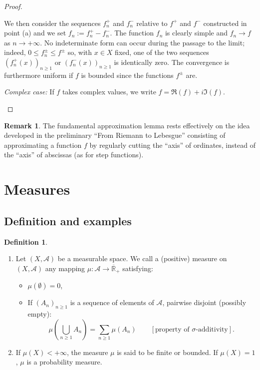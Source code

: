 \documentclass[12pt]{article}
\theoremstyle{definition}
\newtheorem{definition}{Definition}[section]
\newtheorem{remark}{Remark}[section]
\begin{document}
\begin{proof}
\begin{itemize}
We then consider the sequences $f_n^+$ and $f_n^-$ relative to $f^+$ and $f^-$ constructed in point (a) and we set $f_n := f_n^+ - f_n^-$. The function $f_n$ is clearly simple and $f_n \to f$ as $n \to +\infty$. No indeterminate form can occur during the passage to the limit; indeed, $0 \leq f_n^\pm \leq f^\pm$ so, with $x \in X$ fixed, one of the two sequences $(f_n^+(x))_{n \geq 1}$ or $(f_n^-(x))_{n \geq 1}$ is identically zero. The convergence is furthermore uniform if $f$ is bounded since the functions $f^\pm$ are.

\textit{Complex case:} If $f$ takes complex values, we write $f = \Re(f) + i\Im(f)$. 
\end{itemize}
\end{proof}

\begin{remark}
The fundamental approximation lemma rests effectively on the idea developed in the preliminary “From Riemann to Lebesgue” consisting of approximating a function $f$ by regularly cutting the “axis” of ordinates, instead of the “axis” of abscissas (as for step functions).
\end{remark}

\clearpage

\section{Measures}
\subsection{Definition and examples}

\begin{definition}
\begin{enumerate}[label=(\alph*),leftmargin=1.5em]
    \item Let $(X, \mathscr{A})$ be a measurable space. We call a (positive) measure on $(X, \mathscr{A})$ any mapping $\mu : \mathscr{A} \to \overline{\mathbb{R}}_+$ satisfying:
    \begin{itemize}
        \item[(i)] $\mu(\emptyset) = 0$,
        \item[(ii)] If $(A_n)_{n \geq 1}$ is a sequence of elements of $\mathscr{A}$, pairwise disjoint (possibly empty):
        $$ \mu\left(\bigcup_{n \geq 1} A_n\right) = \sum_{n \geq 1} \mu(A_n) \qquad [\text{property of } \sigma\text{-additivity}]. $$
    \end{itemize}
    \item If $\mu(X) < +\infty$, the measure $\mu$ is said to be finite or bounded. If $\mu(X) = 1$, $\mu$ is a probability measure.
\end{enumerate}
\end{definition}
\end{document}
